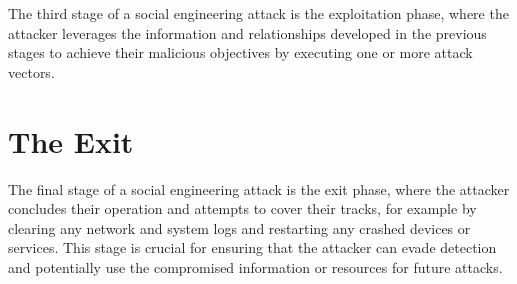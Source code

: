 The third stage of a social engineering attack is the exploitation phase, where the attacker leverages the information and relationships developed in the previous stages to achieve their malicious objectives by executing one or more attack vectors.





\section{The Exit}
\begin{comment}
    
    - Not burning any bridges
    - Using the built relationships for future SE attacks
    - "Always leave them better off for having met you" also serves the purpose of using built relationships in the future again

\end{comment}

The final stage of a social engineering attack is the exit phase, where the attacker concludes their operation and attempts to cover their tracks, for example by clearing any network and system logs and restarting any crashed devices or services. This stage is crucial for ensuring that the attacker can evade detection and potentially use the compromised information or resources for future attacks.








